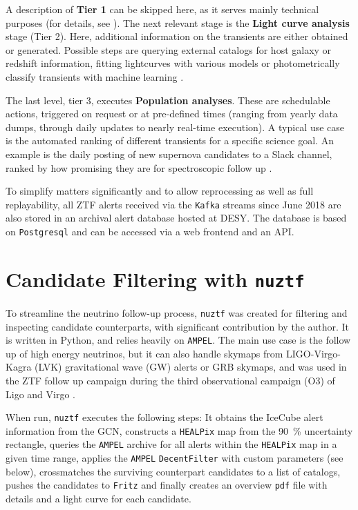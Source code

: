 A description of \textbf{Tier 1} can be skipped here, as it serves mainly technical purposes (for details, see \cite{Nordin2019}). The next relevant stage is the \textbf{Light curve analysis} stage (Tier 2). Here, additional information on the transients are either obtained or generated. Possible steps are querying external catalogs for host galaxy or redshift information, fitting lightcurves with various models or photometrically classify transients with machine learning \cite{Nordin2019}.

The last level, tier 3, executes \textbf{Population analyses}. These are schedulable actions, triggered on request or at pre-defined times (ranging from yearly data dumps, through daily updates to nearly real-time execution). A typical use case is the automated ranking of different transients for a specific science goal. An example is the daily posting of new supernova candidates to a Slack channel, ranked by how promising they are for spectroscopic follow up \cite{Nordin2019}.

To simplify matters significantly and to allow reprocessing as well as full replayability, all ZTF alerts received via the \texttt{Kafka} streams since June 2018 are also stored in an archival alert database hosted at DESY. The database is based on \texttt{Postgresql} and can be accessed via a web frontend and an API.

\section{Candidate Filtering with \texttt{nuztf}}
To streamline the neutrino follow-up process, \texttt{nuztf}  was created for filtering and inspecting candidate counterparts, with significant contribution by the author. It is written in Python, and relies heavily on \texttt{AMPEL}. The main use case is the follow up of high energy neutrinos, but it can also handle skymaps from LIGO-Virgo-Kagra (LVK) gravitational wave (GW) alerts or GRB skymaps, and was used in the ZTF follow up campaign during the third observational campaign (O3) of Ligo and Virgo \cite{Kasliwal2020}.

When run, \texttt{nuztf} executes the following steps: It obtains the IceCube alert information from the GCN, constructs a \texttt{HEALPix} map from the \SI{90}{\percent} uncertainty rectangle, queries the \texttt{AMPEL} archive for all alerts within the \texttt{HEALPix} map in a given time range, applies the \texttt{AMPEL} \texttt{DecentFilter} \cite{Nordin2019} with custom parameters (see below), crossmatches the surviving counterpart candidates to a list of catalogs, pushes the candidates to \texttt{Fritz} and finally creates an overview \texttt{pdf} file with details and a light curve for each candidate.

